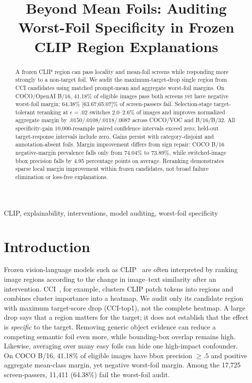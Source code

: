 \documentclass[10pt]{article}
\title{Beyond Mean Foils: Auditing Worst-Foil Specificity in Frozen CLIP Region Explanations}
\begin{document}
\maketitle

\begin{abstract}
A frozen CLIP region can pass locality and mean-foil screens while responding
more strongly to a non-target foil. We audit the maximum-target-drop single
region from CCI candidates using matched prompt-mean and aggregate worst-foil
margins. On COCO/OpenAI B/16, 41.18\% of eligible images pass both screens yet
have negative worst-foil margin; 64.38\% [63.67,65.07]\% of screen-passers fail.
Selection-stage target-tolerant reranking at
$\epsilon=.02$ switches 2.0--2.6\% of images and improves normalized aggregate
margin by $.0150/.0108/.0118/.0087$ across COCO/VOC and B/16/B/32.
All specificity-gain 10,000-resample paired confidence intervals exceed zero;
held-out target-response intervals include zero. Gains persist with
category-disjoint and annotation-absent foils. Margin improvement differs from
sign repair: COCO B/16 negative-margin prevalence falls only from 74.04\% to
73.89\%, while switched-image bbox precision falls by 4.95 percentage points
on average. Reranking demonstrates sparse local margin improvement within
frozen candidates, not broad failure elimination or loss-free explanations.
\end{abstract}
\begin{keywords}
CLIP, explainability, interventions, model auditing, worst-foil specificity
\end{keywords}

\section{Introduction}
Frozen vision-language models such as CLIP~\cite{radford2021clip} are often interpreted by ranking image regions
according to the change in image--text similarity after an intervention.
CCI~\cite{agarwal2025cci}, for example, clusters CLIP patch tokens into regions
and combines cluster importance into a heatmap. We audit only its candidate
region with maximum target-score drop (CCI-top1), not the complete heatmap. A large drop says
that a region matters for the target; it does not establish that the effect is
\emph{specific} to the target. Removing generic object evidence can reduce a
competing semantic foil even more, while bounding-box overlap remains high.
Likewise, averaging over many easy foils can hide one high-impact confounder.
On COCO B/16, 41.18\% of eligible images have bbox precision $\ge .5$ and
positive aggregate mean-class margin, yet negative worst-foil margin.
Among the 17,725 screen-passers, 11,411 (64.38\%) fail the worst-foil audit.
\end{document}
